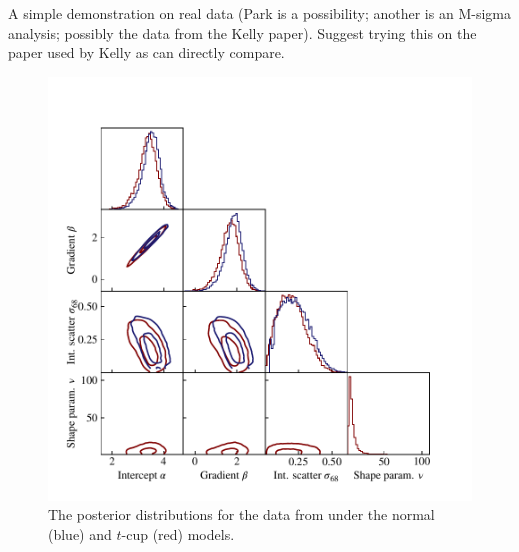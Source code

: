 \documentclass[fleqn,usenatbib]{mnras}
\begin{document}
A simple demonstration on real data (Park is a possibility; another is an
M-sigma analysis; possibly the data from the Kelly paper).  Suggest trying this
on the paper used by Kelly as can directly compare.

\begin{figure}
    \includegraphics[width=\columnwidth]{graphics/corner_kelly.pdf}
    \caption{The posterior distributions for the data from \citet{Kelly:2007}
    under the normal (blue) and $t$-cup (red) models.}
    \label{fig:real-world.kelly.corner}
\end{figure}


\end{document}
